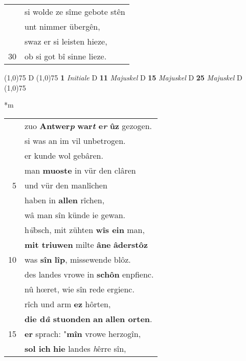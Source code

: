 \documentclass[8pt,a4paper,notitlepage]{article}
\begin{document}
\begin{table}[ht]
\begin{minipage}[t]{0.5\linewidth}
\begin{tabular}{rl}
 & si wolde ze sîme gebote stên\\ 
 & unt nimmer übergên,\\ 
 & swaz er si leisten hieze,\\ 
30 & ob si got bî sinne lieze.\\ 
\end{tabular}
\scriptsize
\line(1,0){75} \newline
D \newline
\line(1,0){75} \newline
\textbf{1} \textit{Initiale} D  \textbf{11} \textit{Majuskel} D  \textbf{15} \textit{Majuskel} D  \textbf{25} \textit{Majuskel} D  \newline
\line(1,0){75} \newline
\newline
\end{minipage}
\hspace{0.5cm}
\begin{minipage}[t]{0.5\linewidth}
\small
\begin{center}*m
\end{center}
\begin{tabular}{rl}
 & zuo \textbf{Antwer\textit{p}} \textbf{war\textit{t} e\textit{r}} \textbf{ûz} gezogen.\\ 
 & si was an im vil unbetrogen.\\ 
 & er kunde wol gebâren.\\ 
 & man \textbf{muoste} in vür den clâren\\ 
5 & und vür den manlîchen\\ 
 & haben in \textbf{allen} rîchen,\\ 
 & wâ man sîn künde ie gewan.\\ 
 & h\textit{ü}bsch, mit zühten \textbf{wîs ein} man,\\ 
 & \textbf{mit triuwen} milte \textbf{âne} \textbf{âderstôz}\\ 
10 & was \textbf{sîn} \textbf{lîp}, missewende blôz.\\ 
 & des landes vrowe in \textbf{schôn} enpfienc.\\ 
 & nû hœret, wie sîn rede ergienc.\\ 
 & rîch und arm \textbf{ez} hôrten,\\ 
 & \textbf{die d\textit{â} stuonden} \textbf{an} \textbf{allen orten}.\\ 
15 & \textbf{er} sprach: "\textbf{mîn} vrowe herzogîn,\\ 
 & \textbf{sol ich} \textbf{hie} landes \textit{h}êrre sîn,\\ 

\end{tabular}
\end{minipage}
\end{table}
\end{document}
